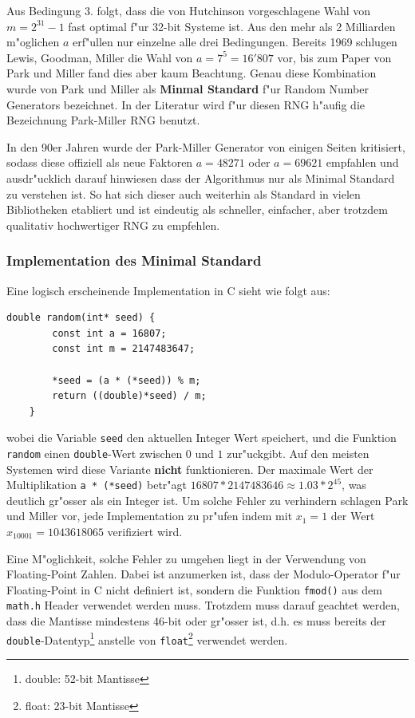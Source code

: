 \begin{refsection}
Aus Bedingung 3. folgt, dass die von Hutchinson \cite{rng:Hutchinson1966}
vorgeschlagene Wahl von $m = 2^{31} - 1$ fast optimal f"ur 32-bit Systeme
ist. Aus den mehr als 2 Milliarden m"oglichen $a$ erf"ullen nur einzelne
alle drei Bedingungen. Bereits 1969 schlugen Lewis, Goodman, Miller
\cite{rng:LewisGoodmanMiller1969} die Wahl von $a = 7^5 = 16'807$ vor,
bis zum Paper von Park und Miller fand dies aber kaum Beachtung. Genau
diese Kombination wurde von Park und Miller als \textbf{Minmal Standard}
f"ur Random Number Generators bezeichnet. In der Literatur wird f"ur
diesen RNG h"aufig die Bezeichnung Park-Miller RNG benutzt.

In den 90er Jahren wurde der Park-Miller Generator von einigen Seiten
kritisiert, sodass diese offiziell als neue Faktoren $a = 48271$ oder
$a = 69621$ empfahlen und ausdr"ucklich darauf hinwiesen dass der
Algorithmus nur als Minimal Standard zu verstehen ist. So hat sich
dieser auch weiterhin als Standard in vielen Bibliotheken etabliert
und ist eindeutig als schneller, einfacher, aber trotzdem qualitativ
hochwertiger RNG zu empfehlen.

\subsubsection{Implementation des Minimal Standard}
Eine logisch erscheinende Implementation in C sieht wie folgt aus:
\begin{lstlisting}[style=C]
	double random(int* seed) {
		const int a = 16807;
		const int m = 2147483647;
		
		*seed = (a * (*seed)) % m;
		return ((double)*seed) / m;
	}
\end{lstlisting}
wobei die Variable \texttt{seed} den aktuellen Integer Wert speichert,
und die Funktion \texttt{random} einen \texttt{double}-Wert zwischen
$0$ und $1$ zur"uckgibt. Auf den meisten Systemen wird diese Variante
\textbf{nicht} funktionieren. Der maximale Wert der Multiplikation
\texttt{a * (*seed)} betr"agt $16807*2147483646 \approx 1.03 * 2^{45}$,
was deutlich gr"osser als ein Integer ist. Um solche Fehler zu verhindern
schlagen Park und Miller vor, jede Implementation zu pr"ufen indem mit
$x_1 = 1$ der Wert $x_{10001} = 1043618065$ verifiziert wird.

Eine M"oglichkeit, solche Fehler zu umgehen liegt in der Verwendung
von Floating-Point Zahlen. Dabei ist anzumerken ist, dass der
Modulo-Operator f"ur Floating-Point in C nicht definiert ist,
sondern die Funktion \texttt{fmod()} aus dem \texttt{math.h} Header
verwendet werden muss. Trotzdem muss darauf geachtet werden, dass die
Mantisse mindestens 46-bit oder gr"osser ist, d.h. es muss bereits der
\texttt{double}-Datentyp\footnote{double: 52-bit Mantisse} anstelle von
\texttt{float}\footnote{float: 23-bit Mantisse} verwendet werden.


\end{refsection}
